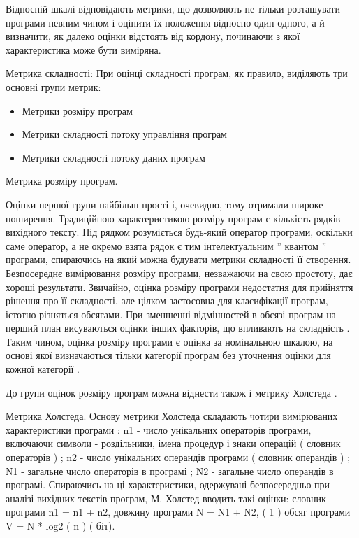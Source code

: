 Відносній шкалі відповідають метрики, що дозволяють не тільки розташувати програми певним чином і оцінити їх положення відносно один одного, а й визначити, як далеко оцінки відстоять від кордону, починаючи з якої характеристика може бути виміряна.

Метрика складності:
При оцінці складності програм, як правило, виділяють три основні групи метрик:
\begin{itemize}
\item {} 
Метрики розміру програм

\item {} 
Метрики складності потоку управління програм

\item {} 
Метрики складності потоку даних програм

\end{itemize}

Метрика розміру програм.

Оцінки першої групи найбільш прості і, очевидно, тому отримали широке поширення. Традиційною характеристикою розміру програм є кількість рядків вихідного тексту. Під рядком розуміється будь-який оператор програми, оскільки саме оператор, а не окремо взята рядок є тим інтелектуальним '' квантом '' програми, спираючись на який можна будувати метрики складності її створення.
Безпосереднє вимірювання розміру програми, незважаючи на свою простоту, дає хороші результати. Звичайно, оцінка розміру програми недостатня для прийняття рішення про її складності, але цілком застосовна для класифікації програм, істотно різняться обсягами. При зменшенні відмінностей в обсязі програм на перший план висуваються оцінки інших факторів, що впливають на складність . Таким чином, оцінка розміру програми є оцінка за номінальною шкалою, на основі якої визначаються тільки категорії програм без уточнення оцінки для кожної категорії .

До групи оцінок розміру програм можна віднести також і метрику Холстеда .

Метрика Холстеда.
Основу метрики Холстеда складають чотири вимірюваних характеристики програми :
n1 - число унікальних операторів програми, включаючи символи -
роздільники, імена процедур і знаки операцій ( словник операторів ) ;
n2 - число унікальних операндів програми ( словник операндів ) ;
N1 - загальне число операторів в програмі ;
N2 - загальне число операндів в програмі.
Спираючись на ці характеристики, одержувані безпосередньо при аналізі вихідних текстів програм, М. Холстед вводить такі оцінки:
словник програми
 n1 = n1 + n2,
довжину програми
 N = N1 + N2, ( 1 )
обсяг програми
 V = N * log2 ( n ) ( біт).


